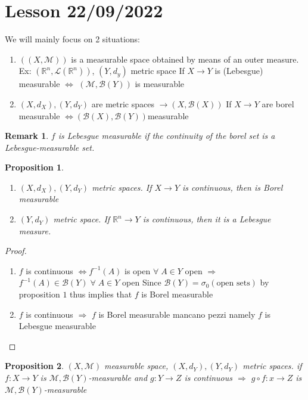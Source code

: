 \documentclass[a4paper,12pt]{article}
\theoremstyle{break}
\newtheorem{proposition}{Proposition}[section]
\newtheorem{remark}[section]{Remark}
\numberwithin{equation}{section}
\begin{document}
\section{Lesson 22/09/2022}
We will mainly focus on 2 situations:
\begin{enumerate}
    \item  \(((X, \mathcal{M}))\) is a measurable space obtained by means of an outer measure. Ex: \((\mathbb{R}^n, \mathcal{L}(\mathbb{R}^n))\), \((Y, d_y)\) metric space
    If \(X \to Y\) is (Lebesgue) measurable \(\Longleftrightarrow\) \((\mathcal{M}, \mathcal{B}(Y))\) is measurable
    \item \((X, d_X), (Y, d_Y)\) are metric spaces \(\longrightarrow (X, \mathcal{B}(X))\)
    If \(X \to Y\) are borel measurable \(\Longleftrightarrow (\mathcal{B}(X), \mathcal{B}(Y)) \)measurable
\end{enumerate}
\begin{remark}
     \(f\) is Lebesgue measurable if the continuity of the borel set is a Lebesgue-measurable set.
\end{remark}
\begin{proposition}
    \begin{enumerate}
        \item \((X, d_X), (Y, d_Y)\) metric spaces. If \(X \to Y\) is continuous, then is Borel measurable
        \item \((Y, d_Y)\) metric space. If \(\mathbb{R}^n \to Y\) is continuous, then it is a Lebesgue measure.
    \end{enumerate}
\end{proposition}
\begin{proof}
    \begin{enumerate}
        \item \(f\) is continuous \(\Longleftrightarrow f^{-1}(A)\) is open \(\forall \; A \in Y\)
        open \(\Longrightarrow\) \(f^{-1}(A) \in \mathcal{B}(Y) \; \forall \; A \in Y\) open
        Since \(\mathcal{B}(Y) = \sigma_0(\mbox{open sets})\) by proposition \(1\) thus implies that \(f\) is Borel measurable
        \item \(f\) is continuous \(\Longrightarrow\) \(f\) is Borel measurable
        mancano pezzi namely \(f\) is Lebesgue measurable
    \end{enumerate}
\end{proof}
\begin{proposition}
    \((X, \mathcal{M})\) measurable space, \((X, d_Y), (Y, d_Y)\) metric spaces. 
    if \(f: X \to Y\) is \(\mathcal{M}, \mathcal{B}(Y)\)-measurable and \(g : Y \to Z\) is continuous \(\Longrightarrow\) \(g \circ f : x \to Z\) is \(\mathcal{M}, \mathcal{B}(Y)\)-measurable
\end{proposition}
\end{document}
